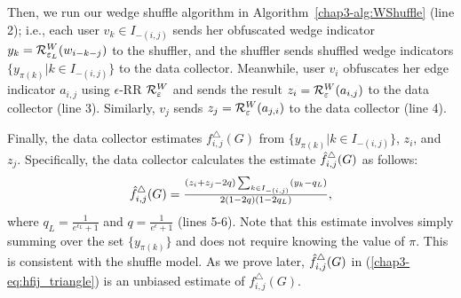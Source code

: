 Then, we run our wedge shuffle algorithm \AlgWS{} in Algorithm~\ref{chap3-alg:WShuffle} (line 2); i.e., each user $v_k \in I_{-(i,j)}$ sends her obfuscated wedge indicator
$y_k = \mathcal{R}_{\varepsilon_L}^W(w_{i-k-j})$ to the shuffler, and the shuffler sends
shuffled wedge indicators $\{y_{\pi(k)} | k \in I_{-(i,j)}\}$ to the data collector.
Meanwhile, user $v_i$ obfuscates her edge indicator $a_{i,j}$ using $\epsilon$-RR $\mathcal{R}_{\varepsilon}^W$ and sends the result $z_i = \mathcal{R}_{\varepsilon}^W(a_{i,j})$ to the data collector
(line 3).
Similarly, $v_j$ sends $z_j = \mathcal{R}_{\varepsilon}^W(a_{j,i})$ to the data collector (line 4).


Finally, the data collector estimates $f_{i,j}^\triangle(G)$ from $\{y_{\pi(k)} | k \in I_{-(i,j)}\}$, $z_i$, and $z_j$.
Specifically, the data collector calculates the estimate $\hat{f}_{i,j}^\triangle(G)$ as follows:
\begin{align}
    \textstyle{\hat{f}_{i,j}^\triangle(G) = \frac{(z_i+z_j-2q)\sum_{k \in I_{-(i,j)}} (y_{k} -
    q_L)}{2(1-2q)(1-2q_L)},}
    \label{chap3-eq:hfij_triangle}
\end{align}
where $q_L = \frac{1}{e^{\epsilon_L}+1}$ and $q = \frac{1}{e^\epsilon+1}$ (lines 5-6).
Note that this estimate involves simply summing over the set $\{y_{\pi(k)}\}$ and does not require knowing the value of $\pi$. This is
consistent with the shuffle model.
As we prove later, $\hat{f}_{i,j}^\triangle(G)$ in (\ref{chap3-eq:hfij_triangle}) is an unbiased estimate of $f_{i,j}^\triangle(G)$.

